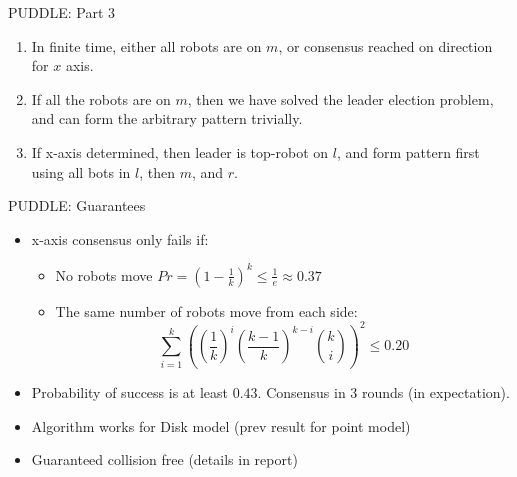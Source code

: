 \documentclass{beamer}
\begin{document}
\begin{frame}{PUDDLE: Part 3}
	\begin{enumerate}
		\item In finite time, either all robots are on $m$,
		or consensus reached on direction for $x$ axis.
		\item If all the robots are on $m$, then we have solved the leader election problem, and 
		can form the arbitrary pattern trivially.
		\item If x-axis determined, then leader is top-robot on $l$, and form pattern first using
		all bots in $l$, then $m$, and $r$.
	\end{enumerate}
		
%
%			
%
%
%
%
\end{frame}

\begin{frame}{PUDDLE: Guarantees }
	\begin{itemize}
		\item x-axis consensus  only fails if:
			\begin{itemize}
				\item No robots move $Pr = (1 - \frac{1}{k})^{k} \leq \frac{1}{e} \approx 0.37$
				\item The same number of robots move from each side:
					$$\sum_{i=1}^{k}{((\frac{1}{k})^i (\frac{k-1}{k})^{k-i} {k\choose i})^2} \leq 0.20$$
			\end{itemize}
		\item Probability of success is at least $0.43$. Consensus in 3 rounds (in expectation).
		\item Algorithm works for Disk model (prev result for point model)
		\item Guaranteed collision free (details in report)
	\end{itemize}
\end{frame}
\end{document}
